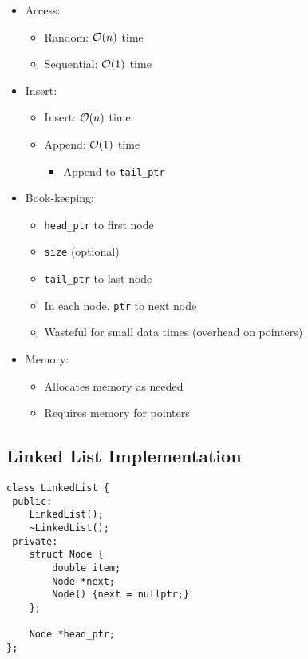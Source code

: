 \begin{itemize}
	\item Access:
	\begin{itemize}
		\item Random: $\mathcal{O}(n)$ time
		\item Sequential: $\mathcal{O}(1)$ time
	\end{itemize}

	\item Insert:
	\begin{itemize}
		\item Insert: $\mathcal{O}(n)$ time
		\item Append: $\mathcal{O}(1)$ time
		\begin{itemize}
			\item Append to \lstinline[style=C++]{tail_ptr}
		\end{itemize}
	\end{itemize}

	\item Book-keeping:
	\begin{itemize}
		\item \lstinline[style=C++]{head_ptr} to first node
		\item \lstinline[style=C++]{size} (optional)
		\item \lstinline[style=C++]{tail_ptr} to last node
		\item In each node, \lstinline[style=C++]{ptr} to next node
		\item Wasteful for small data times (overhead on pointers)
	\end{itemize}

	\item Memory:
	\begin{itemize}
		\item Allocates memory as needed
		\item Requires memory for pointers
	\end{itemize}
\end{itemize}

\subsection{Linked List Implementation}
\begin{lstlisting}[style=C++]
class LinkedList {
 public:
    LinkedList();
    ~LinkedList();
 private:
    struct Node {
        double item;
        Node *next;
        Node() {next = nullptr;}
    };

    Node *head_ptr;
};
\end{lstlisting}

